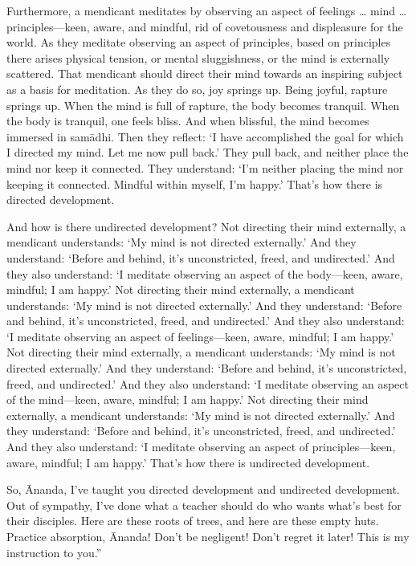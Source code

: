 \documentclass[12pt,openany]{book}%
\begin{document}
Furthermore, a mendicant meditates by observing an aspect of feelings … mind … principles—keen, aware, and mindful, rid of covetousness and displeasure for the world. As they meditate observing an aspect of principles, based on principles there arises physical tension, or mental sluggishness, or the mind is externally scattered. That mendicant should direct their mind towards an inspiring subject as a basis for meditation. As they do so, joy springs up. Being joyful, rapture springs up. When the mind is full of rapture, the body becomes tranquil. When the body is tranquil, one feels bliss. And when blissful, the mind becomes immersed in \textsanskrit{samādhi}. Then they reflect: ‘I have accomplished the goal for which I directed my mind. Let me now pull back.’ They pull back, and neither place the mind nor keep it connected. They understand: ‘I’m neither placing the mind nor keeping it connected. Mindful within myself, I’m happy.’ That’s how there is directed development. 

And how is there undirected development? Not directing their mind externally, a mendicant understands: ‘My mind is not directed externally.’ And they understand: ‘Before and behind, it’s unconstricted, freed, and undirected.’ And they also understand: ‘I meditate observing an aspect of the body—keen, aware, mindful; I am happy.’ Not directing their mind externally, a mendicant understands: ‘My mind is not directed externally.’ And they understand: ‘Before and behind, it’s unconstricted, freed, and undirected.’ And they also understand: ‘I meditate observing an aspect of feelings—keen, aware, mindful; I am happy.’ Not directing their mind externally, a mendicant understands: ‘My mind is not directed externally.’ And they understand: ‘Before and behind, it’s unconstricted, freed, and undirected.’ And they also understand: ‘I meditate observing an aspect of the mind—keen, aware, mindful; I am happy.’ Not directing their mind externally, a mendicant understands: ‘My mind is not directed externally.’ And they understand: ‘Before and behind, it’s unconstricted, freed, and undirected.’ And they also understand: ‘I meditate observing an aspect of principles—keen, aware, mindful; I am happy.’ That’s how there is undirected development. 

So, Ānanda, I’ve taught you directed development and undirected development. Out of sympathy, I’ve done what a teacher should do who wants what’s best for their disciples. Here are these roots of trees, and here are these empty huts. Practice absorption, Ānanda! Don’t be negligent! Don’t regret it later! This is my instruction to you.” 
\end{document}
